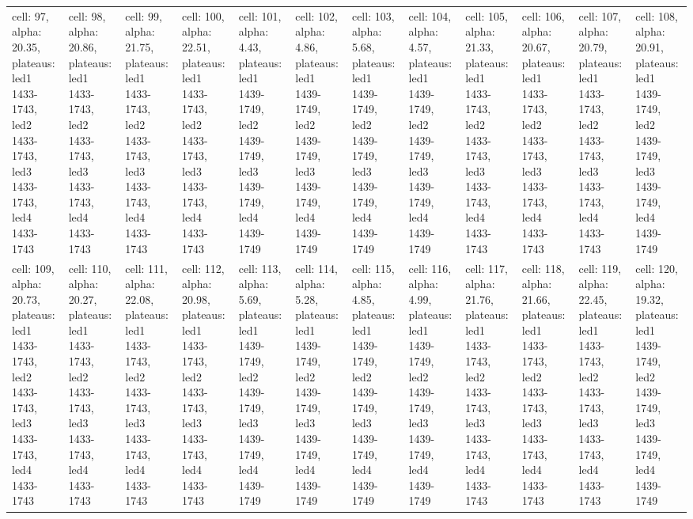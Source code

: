 \begin{landscape}
\begin{longtable}{|l|l|l|l|l|l|l|l|l|l|l|l|}
\rowcolor{lightgray} cell: 97, alpha: 20.35, plateaus: led1 1433-1743, led2 1433-1743, led3 1433-1743, led4 1433-1743 &cell: 98, alpha: 20.86, plateaus: led1 1433-1743, led2 1433-1743, led3 1433-1743, led4 1433-1743 &cell: 99, alpha: 21.75, plateaus: led1 1433-1743, led2 1433-1743, led3 1433-1743, led4 1433-1743 &cell: 100, alpha: 22.51, plateaus: led1 1433-1743, led2 1433-1743, led3 1433-1743, led4 1433-1743 &cell: 101, alpha: 4.43, plateaus: led1 1439-1749, led2 1439-1749, led3 1439-1749, led4 1439-1749 &cell: 102, alpha: 4.86, plateaus: led1 1439-1749, led2 1439-1749, led3 1439-1749, led4 1439-1749 &cell: 103, alpha: 5.68, plateaus: led1 1439-1749, led2 1439-1749, led3 1439-1749, led4 1439-1749 &cell: 104, alpha: 4.57, plateaus: led1 1439-1749, led2 1439-1749, led3 1439-1749, led4 1439-1749 &cell: 105, alpha: 21.33, plateaus: led1 1433-1743, led2 1433-1743, led3 1433-1743, led4 1433-1743 &cell: 106, alpha: 20.67, plateaus: led1 1433-1743, led2 1433-1743, led3 1433-1743, led4 1433-1743 &cell: 107, alpha: 20.79, plateaus: led1 1433-1743, led2 1433-1743, led3 1433-1743, led4 1433-1743 &cell: 108, alpha: 20.91, plateaus: led1 1439-1749, led2 1439-1749, led3 1439-1749, led4 1439-1749 \\
cell: 109, alpha: 20.73, plateaus: led1 1433-1743, led2 1433-1743, led3 1433-1743, led4 1433-1743 &cell: 110, alpha: 20.27, plateaus: led1 1433-1743, led2 1433-1743, led3 1433-1743, led4 1433-1743 &cell: 111, alpha: 22.08, plateaus: led1 1433-1743, led2 1433-1743, led3 1433-1743, led4 1433-1743 &cell: 112, alpha: 20.98, plateaus: led1 1433-1743, led2 1433-1743, led3 1433-1743, led4 1433-1743 &cell: 113, alpha: 5.69, plateaus: led1 1439-1749, led2 1439-1749, led3 1439-1749, led4 1439-1749 &cell: 114, alpha: 5.28, plateaus: led1 1439-1749, led2 1439-1749, led3 1439-1749, led4 1439-1749 &cell: 115, alpha: 4.85, plateaus: led1 1439-1749, led2 1439-1749, led3 1439-1749, led4 1439-1749 &cell: 116, alpha: 4.99, plateaus: led1 1439-1749, led2 1439-1749, led3 1439-1749, led4 1439-1749 &cell: 117, alpha: 21.76, plateaus: led1 1433-1743, led2 1433-1743, led3 1433-1743, led4 1433-1743 &cell: 118, alpha: 21.66, plateaus: led1 1433-1743, led2 1433-1743, led3 1433-1743, led4 1433-1743 &cell: 119, alpha: 22.45, plateaus: led1 1433-1743, led2 1433-1743, led3 1433-1743, led4 1433-1743 &cell: 120, alpha: 19.32, plateaus: led1 1439-1749, led2 1439-1749, led3 1439-1749, led4 1439-1749 \\

\end{longtable}
\end{landscape}
